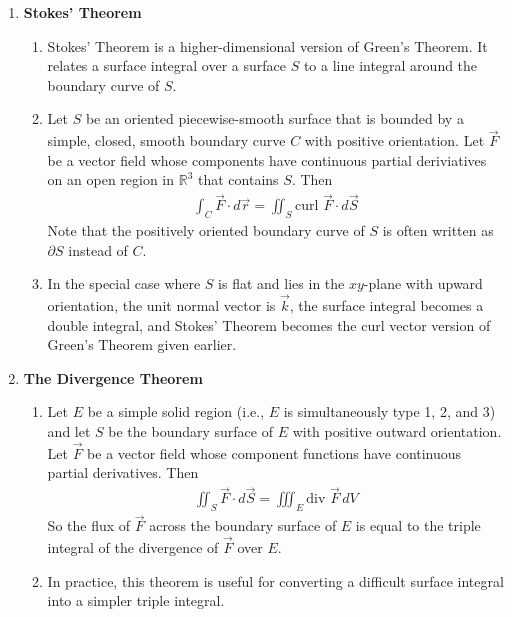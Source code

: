 \documentclass[10pt]{article}
\begin{document}
\begin{multicols}{2}
\begin{enumerate}
    \item \textbf{Stokes' Theorem}
    \begin{enumerate}
        \item Stokes' Theorem is a higher-dimensional version of Green's Theorem. It relates a surface integral over a surface $S$ to a line integral around the boundary curve of $S$.
        \item Let $S$ be an oriented piecewise-smooth surface that is bounded by a simple, closed, smooth boundary curve $C$ with positive orientation. Let $\vec{F}$ be a vector field whose components have continuous partial deriviatives on an open region in $\mathbb{R}^3$ that contains $S$. Then
        \begin{align*}
            \int_C \vec{F} \cdot d\vec{r} = \iint_S \text{curl } \vec{F} \cdot d\vec{S}
        \end{align*}
        Note that the positively oriented boundary curve of $S$ is often written as $\partial S$ instead of $C$.
        
        \item In the special case where $S$ is flat and lies in the $xy$-plane with upward  orientation, the unit normal vector is $\vec{k}$, the surface integral becomes a double integral, and Stokes' Theorem becomes the curl vector version of Green's Theorem given earlier.
    \end{enumerate}
    
    \item \textbf{The Divergence Theorem}
    \begin{enumerate}
        \item Let $E$ be a simple solid region (i.e., $E$ is simultaneously type 1, 2, and 3) and let $S$ be the boundary surface of $E$ with positive outward orientation. Let $\vec{F}$ be a vector field whose component functions have continuous partial derivatives. Then
        \begin{align*}
            \iint_S \vec{F} \cdot d\vec{S} = \iiint_E \text{div } \vec{F} \,dV
        \end{align*}
        So the flux of $\vec{F}$ across the boundary surface of $E$ is equal to the triple integral of the divergence of $\vec{F}$ over $E$.
        \item In practice, this theorem is useful for converting a difficult surface integral into a simpler triple integral.
    \end{enumerate}
\end{enumerate}
\end{multicols}
\end{document}
